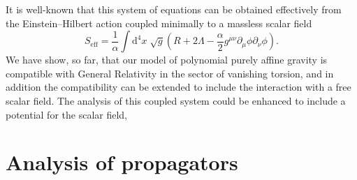 \documentclass[aps,prd,12pt,twocolumn,superscriptaddress,showpacs,showkeys,reprint%
]{revtex4-1}
\newcommand\pa[1]{\partial_{{#1}}}
\renewcommand{\(}{\left(}
\renewcommand{\)}{\right)}
\renewcommand{\[}{\left[}
\renewcommand{\]}{\right]}
\newcommand{\dn}[2]{{\mathrm{d}}^{#1}{#2}\;}
\begin{document}
It is well-known that this system of equations can be obtained effectively from the Einstein--Hilbert action coupled minimally to a massless scalar field
\begin{equation}
  S_{\text{eff}} = \frac{1}{\alpha} \int \dn{4}{x} \sqrt{g} \left( R + 2 \Lambda - \frac{\alpha}{2} g^{\mu\nu} \pa{\mu}\phi \pa{\nu} \phi \right).
\end{equation}
We have show, so far, that our model of polynomial purely affine gravity is compatible with General Relativity in the sector of vanishing torsion, and in addition the compatibility can be extended to include the interaction with a free scalar field. The analysis of this coupled system could be enhanced to include a potential for the scalar field, 


\section{\label{propag}Analysis of propagators}
\end{document}
